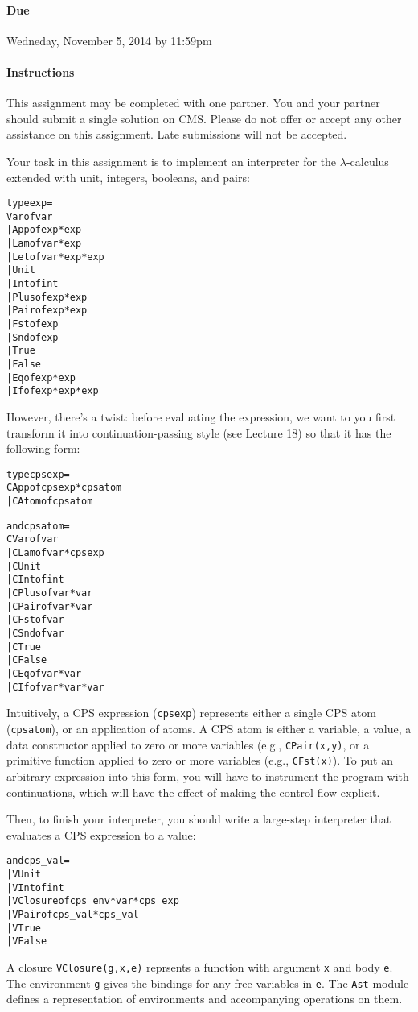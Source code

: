 \documentclass[10pt]{article}
\begin{document}

\paragraph{Due} Wedneday, November 5, 2014 by 11:59pm 

\paragraph{Instructions} 
This assignment may be completed with one partner.  You and your
partner should submit a single solution on CMS. Please do not offer or
accept any other assistance on this assignment. Late submissions will
not be accepted.

\begin{exercise}
Your task in this assignment is to implement an interpreter for the
$\lambda$-calculus extended with unit, integers, booleans, and pairs:
%
\begin{alltt}
type exp =
    Var of var
  | App of exp * exp
  | Lam of var * exp
  | Let of var * exp * exp
  | Unit 
  | Int of int
  | Plus of exp * exp
  | Pair of exp * exp
  | Fst of exp
  | Snd of exp
  | True
  | False
  | Eq of exp * exp
  | If of exp * exp * exp
\end{alltt}
%
However, there's a twist: before evaluating the expression, we want to
you first transform it into continuation-passing style (see Lecture
18) so that it has the following form:
%
\begin{alltt}
type cps{}exp = 
    CApp of cps{}exp * cps{}atom
  | CAtom of cps{}atom 

and cps{}atom = 
    CVar of var
  | CLam of var * cps{}exp
  | CUnit 
  | CInt of int
  | CPlus of var * var 
  | CPair of var * var
  | CFst of var
  | CSnd of var
  | CTrue
  | CFalse
  | CEq of var * var
  | CIf of var * var * var
\end{alltt} 
Intuitively, a CPS expression (\texttt{cps{}exp}) represents
either a single CPS atom (\texttt{cps{}atom}), or an
application of atoms. A CPS atom is either a variable, a value, a data
constructor applied to zero or more variables
(e.g., \texttt{CPair(x,y)}, or a primitive function applied to zero or
more variables (e.g., \texttt{CFst(x)}). To put an arbitrary
expression into this form, you will have to instrument the program
with continuations, which will have the effect of making the control
flow explicit.

Then, to finish your interpreter, you should write a large-step
interpreter that evaluates a CPS expression to a value:
\begin{alltt}
and cps_val = 
  | VUnit 
  | VInt of int
  | VClosure of cps_env * var * cps_exp 
  | VPair of cps_val * cps_val
  | VTrue 
  | VFalse
\end{alltt}  
A closure \texttt{VClosure(g,x,e)} reprsents a function with
argument \texttt{x} and body \texttt{e}. The environment \texttt{g}
gives the bindings for any free variables
in \texttt{e}. The \texttt{Ast} module defines a representation of
environments and accompanying operations on them.


\end{exercise}
\end{document}
